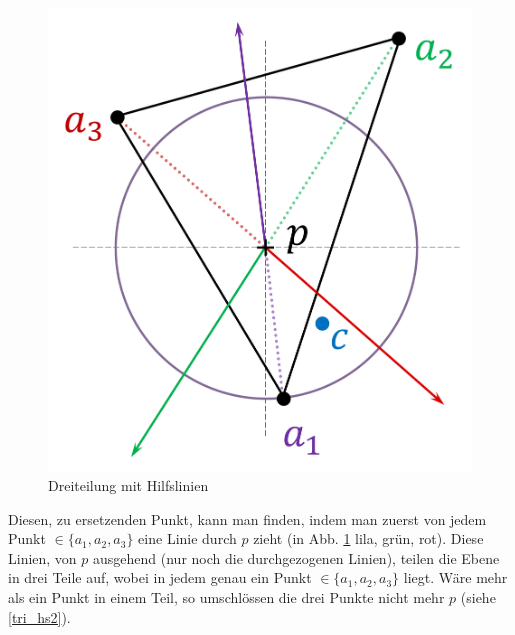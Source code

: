 \documentclass[a4paper]{extarticle}
\begin{document}
    \begin{figure}[!ht]
        \centering	
        \includegraphics[scale=0.15]{bilder/tri_2.pdf}
        \caption{Dreiteilung mit Hilfslinien}
        \label{fig:triangulation_2}
    \end{figure}

    Diesen, zu ersetzenden Punkt, kann man finden, indem man zuerst von jedem Punkt 
    $\in \{ a_1, a_2, a_3 \}$ eine Linie durch $p$ zieht (in Abb. \ref{fig:triangulation_2} lila, 
    grün, rot). Diese Linien, von $p$ ausgehend (nur noch die durchgezogenen Linien), teilen die 
    Ebene in drei Teile auf, wobei in jedem genau ein Punkt $\in \{ a_1, a_2, a_3 \}$ liegt.
    Wäre mehr als ein Punkt in einem Teil, so umschlössen die drei Punkte nicht mehr $p$ 
    (siehe \ref{tri_hs2}).
\end{document}
